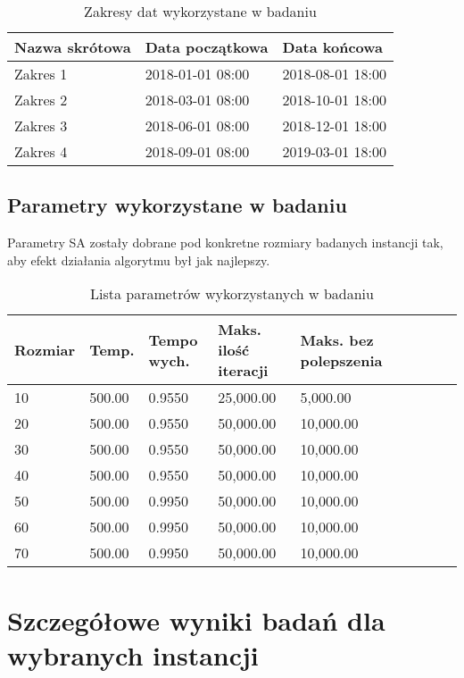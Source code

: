 \begin{table}[H]
    \centering
    \begin{tabular}[width=\textwidth]{ | l | l | l |}
        \hline
        \bfseries Nazwa skrótowa & \bfseries Data początkowa & \bfseries Data końcowa \\
        \hline
        Zakres 1 & 2018-01-01 08:00 & 2018-08-01 18:00 \\
        \hline
        Zakres 2 & 2018-03-01 08:00 & 2018-10-01 18:00 \\
        \hline
        Zakres 3 & 2018-06-01 08:00 & 2018-12-01 18:00 \\
        \hline
        Zakres 4 & 2018-09-01 08:00 & 2019-03-01 18:00 \\
        \hline
    \end{tabular}
    \caption{Zakresy dat wykorzystane w badaniu}
\end{table}

\subsection{Parametry wykorzystane w badaniu}
Parametry SA zostały dobrane pod konkretne rozmiary badanych instancji tak, aby efekt
działania algorytmu był jak najlepszy.
\begin{table}[H]
\centering
\begin{tabular}[\textwidth]{ | l | l | l | l | l | l | l | l | l | }
\hline
\bfseries Rozmiar & \bfseries Temp. & \bfseries Tempo wych.
	     & \bfseries Maks. ilość iteracji & \bfseries Maks. bez polepszenia\\
\hline
10 & 500.00 & 0.9550 & 25,000.00 & 5,000.00 \\
\hline
20 & 500.00 & 0.9550 & 50,000.00 & 10,000.00 \\
\hline
30 & 500.00 & 0.9550 & 50,000.00 & 10,000.00 \\
\hline
40 & 500.00 & 0.9550 & 50,000.00 & 10,000.00 \\
\hline
50 & 500.00 & 0.9950 & 50,000.00 & 10,000.00 \\
\hline
60 & 500.00 & 0.9950 & 50,000.00 & 10,000.00 \\
\hline
70 & 500.00 & 0.9950 & 50,000.00 & 10,000.00 \\
\hline
\end{tabular}
\caption{Lista parametrów wykorzystanych w badaniu}
\end{table}

\newpage
\section{Szczegółowe wyniki badań dla wybranych instancji}
